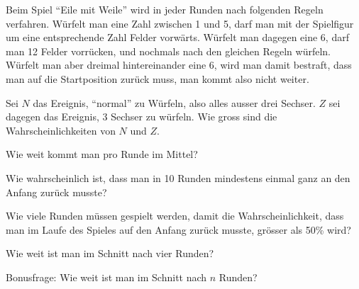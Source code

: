Beim Spiel ``Eile mit Weile'' wird in jeder Runden nach folgenden Regeln
verfahren.
Würfelt man eine Zahl zwischen 1 und 5, darf man mit der Spielfigur
um eine entsprechende Zahl Felder vorwärts. Würfelt man dagegen
eine 6, darf man 12 Felder vorrücken, und nochmals nach den
gleichen Regeln würfeln. Würfelt man aber dreimal hintereinander
eine 6, wird man damit bestraft, dass man auf die Startposition
zurück muss, man kommt also nicht weiter.
\begin{teilaufgaben}
\item Sei $N$ das Ereignis, ``normal'' zu Würfeln, also alles ausser drei
Sechser. $Z$ sei dagegen das Ereignis, 3 Sechser zu würfeln. Wie gross
sind die Wahrscheinlichkeiten von $N$ und $Z$.
\item Wie weit kommt man pro Runde im Mittel?
\item Wie wahrscheinlich ist, dass man in 10 Runden mindestens einmal
ganz an den Anfang zurück musste?
\item Wie viele Runden müssen gespielt werden, damit die Wahrscheinlichkeit,
dass man im Laufe des Spieles auf den Anfang zurück musste, grösser als 50\%
wird?
\item Wie weit ist man im Schnitt nach vier Runden?
\item Bonusfrage: Wie weit ist man im Schnitt nach $n$ Runden?
\end{teilaufgaben}


